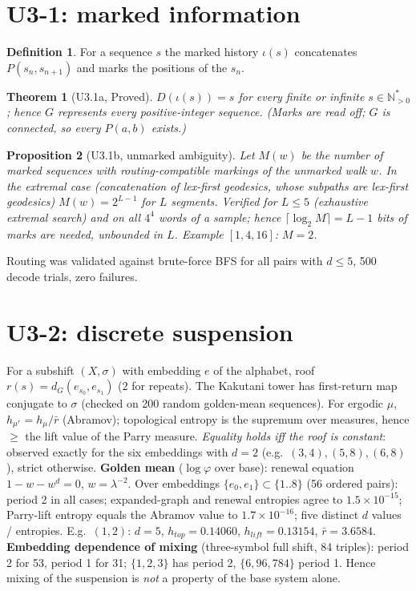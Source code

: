 \documentclass[11pt]{article}
\newtheorem{thm}{Theorem}\newtheorem{prop}[thm]{Proposition}\theoremstyle{definition}\newtheorem{defn}{Definition}
\begin{document}
\section{U3-1: marked information}
\begin{defn}For a sequence $s$ the marked history $\iota(s)$ concatenates $P(s_n,s_{n+1})$ and marks the positions of the $s_n$.\end{defn}
\begin{thm}[U3.1a, Proved] $D(\iota(s))=s$ for every finite or infinite $s\in\mathbb N_{>0}^{*}$; hence $G$ represents every positive-integer sequence. (Marks are read off; $G$ is connected, so every $P(a,b)$ exists.)\end{thm}
\begin{prop}[U3.1b, unmarked ambiguity] Let $M(w)$ be the number of marked sequences with routing-compatible markings of the unmarked walk $w$. In the extremal case (concatenation of lex-first geodesics, whose subpaths are lex-first geodesics) $M(w)=2^{L-1}$ for $L$ segments. Verified for $L\le5$ (exhaustive extremal search) and on all $4^4$ words of a sample; hence $\lceil\log_2 M\rceil=L-1$ bits of marks are needed, unbounded in $L$. Example $[1,4,16]$: $M=2$.\end{prop}
Routing was validated against brute-force BFS for all pairs with $d\le5$, 500 decode trials, zero failures.
\section{U3-2: discrete suspension}
For a subshift $(X,\sigma)$ with embedding $e$ of the alphabet, roof $r(s)=d_G(e_{s_0},e_{s_1})$ ($2$ for repeats). The Kakutani tower has first-return map conjugate to $\sigma$ (checked on 200 random golden-mean sequences). For ergodic $\mu$, $h_{\mu^r}=h_\mu/\bar r$ (Abramov); topological entropy is the supremum over measures, hence $\ge$ the lift value of the Parry measure. \emph{Equality holds iff the roof is constant}: observed exactly for the six embeddings with $d=2$ (e.g.\ $(3,4),(5,8),(6,8)$), strict otherwise.
\textbf{Golden mean} ($\log\varphi$ over base): renewal equation $1-w-w^{d}=0$, $w=\lambda^{-2}$. Over embeddings $\{e_0,e_1\}\subset\{1..8\}$ (56 ordered pairs): period 2 in all cases; expanded-graph and renewal entropies agree to $1.5\times10^{-15}$; Parry-lift entropy equals the Abramov value to $1.7\times10^{-16}$; five distinct $d$ values / entropies. E.g.\ $(1,2)$: $d=5$, $h_{top}=0.14060$, $h_{lift}=0.13154$, $\bar r=3.6584$.
\textbf{Embedding dependence of mixing} (three-symbol full shift, 84 triples): period 2 for 53, period 1 for 31; $\{1,2,3\}$ has period 2, $\{6,96,784\}$ period 1. Hence mixing of the suspension is \emph{not} a property of the base system alone.
\end{document}
